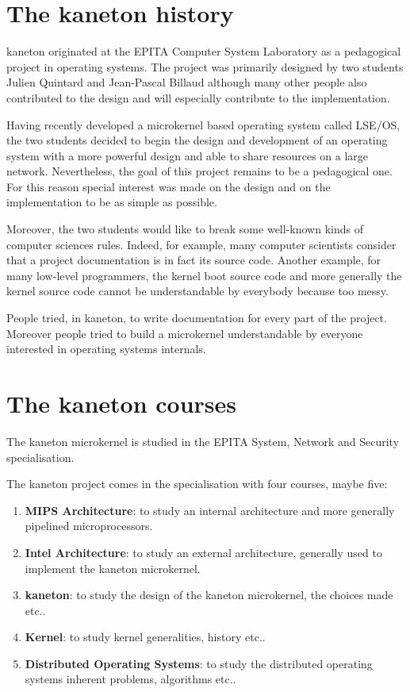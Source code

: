 \begin{multicols}{2}

%
%

\section{The kaneton history}

kaneton originated at the EPITA Computer System Laboratory as a pedagogical
project in operating systems. The project was primarily designed by two
students Julien Quintard and Jean-Pascal Billaud although many other people
also contributed to the design and will especially contribute to the
implementation.

Having recently developed a microkernel based operating system called LSE/OS,
the two students decided to begin the design and development of an operating
system with a more powerful design and able to share resources on a large
network. Nevertheless, the goal of this project remains to be a pedagogical
one. For this reason special interest was made on the design and on the
implementation to be as simple as possible.

Moreover, the two students would like to break some well-known kinds of
computer sciences rules. Indeed, for example, many computer scientists
consider that a project documentation is in fact its source code.
Another example, for many low-level programmers, the kernel boot source code
and more generally the kernel source code cannot be understandable by
everybody because too messy.

People tried, in kaneton, to write documentation for every part of the project.
Moreover people tried to build a microkernel understandable by everyone
interested in operating systems internals.

%
%

\section{The kaneton courses}

The kaneton microkernel is studied in the EPITA System, Network and Security
specialisation.

The kaneton project comes in the specialisation with four courses, maybe
five:

\begin{enumerate}
  \item
    \textbf{MIPS Architecture}: to study an internal architecture and
    more generally pipelined microprocessors.
  \item
    \textbf{Intel Architecture}: to study an external architecture, generally
    used to implement the kaneton microkernel.
  \item
    \textbf{kaneton}: to study the design of the kaneton microkernel, the
    choices made etc..
  \item
    \textbf{Kernel}: to study kernel generalities, history etc..
  \item
    \textbf{Distributed Operating Systems}: to study the distributed
    operating systems inherent problems, algorithms etc..
\end{enumerate}


\end{multicols}
